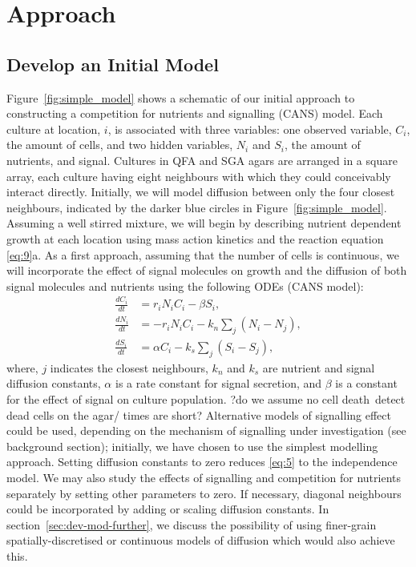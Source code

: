 \graphicspath{{images_low_res/}}
\section{Approach}
\label{sec:approach}

\subsection{Develop an Initial Model}
\label{sec:initial_model}

Figure~\ref{fig:simple_model} shows a schematic of our initial
approach to constructing a competition for nutrients and signalling
(CANS) model. Each culture at location, \(i\), is associated with
three variables: one observed variable, \(C_{i}\), the amount of
cells, and two hidden variables, \(N_{i}\) and \(S_{i}\), the amount
of nutrients, and signal. Cultures in QFA and SGA agars are arranged
in a square array, each culture having eight neighbours with which
they could conceivably interact directly. Initially, we will model
diffusion between only the four closest neighbours, indicated by the
darker blue circles in Figure~\ref{fig:simple_model}. Assuming a well
stirred mixture, we will begin by describing nutrient dependent growth
at each location using mass action kinetics and the reaction equation
\ref{eq:9}a.  As a first approach, assuming that the number of cells
is continuous, we will incorporate the effect of signal molecules on
growth and the diffusion of both signal molecules and nutrients using
the following ODEs (CANS model):
\begin{subequations}
  \label{eq:5}
  \begin{align}
    \frac{dC_{i}}{dt}& = r_{i}N_{i}C_{i} - \beta S_{i},\\
    \frac{dN_{i}}{dt}& = - r_{i}N_{i}C_{i} - k_{n}\sum_{j}(N_{i} - N_{j}),\\
    \frac{dS_{i}}{dt}& = \alpha C_{i} - k_{s}\sum_{j}(S_{i} - S_{j}),
  \end{align}
\end{subequations}
where, \(j\) indicates the closest neighbours, \(k_{n}\) and \(k_{s}\)
are nutrient and signal diffusion constants, \(\alpha\) is a rate
constant for signal secretion, and \(\beta\) is a constant for the
effect of signal on culture population. ?do we assume no cell death\
detect dead cells on the agar/ times are short? Alternative models of
signalling effect could be used, depending on the mechanism of
signalling under investigation (see background section); initially, we
have chosen to use the simplest modelling approach. Setting diffusion
constants to zero reduces \ref{eq:5} to the independence model. We may
also study the effects of signalling and competition for nutrients
separately by setting other parameters to zero. If necessary, diagonal
neighbours could be incorporated by adding or scaling diffusion
constants. In section~\ref{sec:dev-mod-further}, we discuss the
possibility of using finer-grain spatially-discretised or continuous
models of diffusion which would also achieve this.

